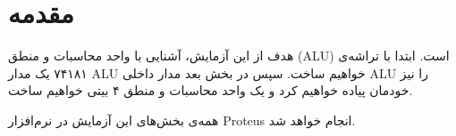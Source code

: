 \documentclass[a4paper,oneside,12pt]{book}
\title{\thesistitle}
\author{\authorname}
\begin{document}

\doublespacing

\newpage
\chapter{مقدمه}
هدف از این آزمایش، آشنایی با واحد محاسبات و منطق 
(ALU)
 است.
 ابتدا با تراشه‌ی
 ۷۴۱۸۱
 یک مدار
 ALU
 خواهیم ساخت.
 سپس در بخش بعد مدار داخلی
 ALU
 را نیز خودمان پیاده خواهیم کرد و یک واحد محاسبات و منطق ۴ بیتی خواهیم ساخت.
 
 همه‌ی بخش‌های این آزمایش در نرم‌افزار
 Proteus
 انجام خواهد شد.




\newpage \tableofcontents

\mainmatter


\end{document}
